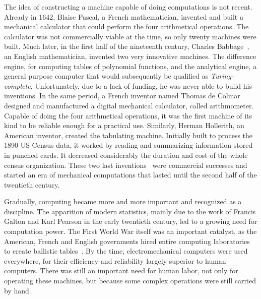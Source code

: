         The idea of constructing a machine capable of doing computations is not recent. Already in 1642, Blaise Pascal,
        a French mathematician, invented and built a mechanical calculator that could perform the four arithmetical
        operations. The calculator was not commercially viable at the time, so only twenty machines were built. Much
        later, in the first half of the nineteenth century, Charles Babbage~\cite[Chapters~2-3]{human_computers}, an
        English mathematician, invented two very innovative machines. The difference engine, for computing tables of
        polynomial functions, and the analytical engine, a general purpose computer that would subsequently be qualified
        as \emph{Turing-complete}. Unfortunately, due to a lack of funding, he was never able to build his inventions.
        In the same period, a French inventor named Thomas de Colmar designed and manufactured a digital
        mechanical calculator, called arithmometer. Capable of doing the four arithmetical operations, it was the first
        machine of its kind to be reliable enough for a practical use.  Similarly, Herman Hollerith, an American
        inventor, created the tabulating machine. Initially built to process the 1890 US Census data, it worked by
        reading and summarizing information stored in punched cards. It decreased considerably the duration and cost of
        the whole census organization. These two last inventions~\cite[Chapter~6]{human_computers} were commercial
        successes and started an era of mechanical computations that lasted until the second half of the twentieth
        century.

        Gradually, computing became more and more important and recognized as a discipline. The apparition of modern
        statistics, mainly due to the work of Francis Galton and Karl Pearson in the early twentieth century, led to a
        growing need for computation power. The First World War itself was an important catalyst, as the American,
        French and English governments hired entire computing laboratories to create ballistic
        tables~\cite[Chapter~10]{human_computers}. By the time, electromechanical computers were used everywhere, for
        their efficiency and reliability largely superior to human computers. There was still an important need for
        human labor, not only for operating these machines, but because some complex operations were still carried by hand.

